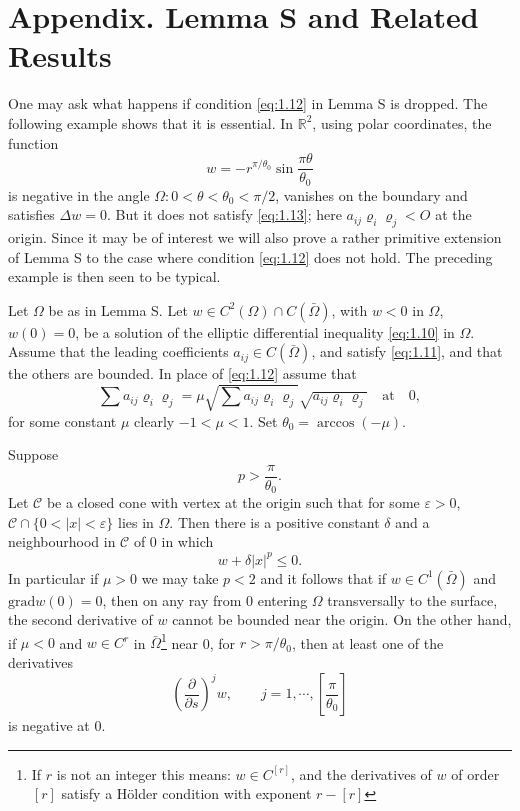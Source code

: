 \section*{Appendix. Lemma S and Related Results}
\setcounter{equation}{0}
\renewcommand{\theequation}{A.\arabic{equation}}
\renewcommand{\thelemma}{A.\arabic{lemma}}

One may ask what happens if condition \eqref{eq:1.12} in Lemma S is dropped. The following example shows that it is essential. In $\mathbb{R}^2$, using polar coordinates, the function
\[w = - r^{\pi/\theta_0} \sin\frac{\pi\theta}{\theta_0}\]
is negative in the angle $\Omega : 0 < \theta < \theta_0 < \pi/2$, vanishes on the boundary and satisfies $\Delta w=0$. But it does not satisfy \eqref{eq:1.13}; here $a_{ij}\varrho_i\varrho_j<O$ at the origin.
Since it may be of interest we will also prove a rather primitive extension of Lemma S to the case where condition \eqref{eq:1.12} does not hold. The preceding example is then seen to be typical.
\begin{lemma}\label{lem:A.1}
	Let $\Omega$ be as in Lemma S. Let $w\in C^2(\Omega)\cap C(\bar{\Omega})$, with $w <0$ in $\Omega$, $w(0) =0$, be a solution of the elliptic differential inequality \eqref{eq:1.10} in $\Omega$. Assume that the leading coefficients $a_{ij}\in C(\bar{\Omega})$, and satisfy \eqref{eq:1.11}, and that the others are bounded. In place of \eqref{eq:1.12} assume that
	\begin{equation}\label{eq:A.1}
		\sum a_{ij}\varrho_i\varrho_j=\mu \sqrt{\sum a_{ij}\varrho_i\varrho_j}\sqrt{a_{ij}\varrho_i\varrho_j}\quad \text{at}\quad 0,
	\end{equation}
	for some constant $\mu$ clearly $-1 <\mu < 1$. Set $\theta_0 = \arccos(-\mu)$.
	
	Suppose 
	\[p>\frac{\pi}{\theta_0}.\]
	Let $\mathscr{C}$ be a closed cone with vertex at the origin such that for some $\varepsilon>0$, $\mathscr{C}\cap\{0 < |x| < \varepsilon\}$ lies in $\Omega$. Then there is a positive constant $\delta$ and a neighbourhood in $\mathscr{C}$ of 0 in which
	\[w+\delta|x|^p\leq 0.\]
	In particular if $\mu>0$ we may take $p<2$ and it follows that if $w\in C^1(\bar{\Omega})$ and $\mathrm{grad }w(0)=0$, then on any ray from 0 entering $\Omega$ transversally to the surface, the second derivative of $w$ cannot be bounded near the origin. On the other hand, if $\mu<0$ and $w\in C^r$ in $\bar{\Omega}$\footnote[1]{If $r$ is not an integer this means: $w\in C^{[r]}$, and the derivatives of $w$ of order $[r]$ satisfy a H\"older condition with exponent $r - [ r ]$} near 0, for $r > \pi/\theta_0$, then at least one of the derivatives
	\[\left(\frac{\partial}{\partial s}\right)^jw,\qquad j=1,\cdots,\left[\frac{\pi}{\theta_0}\right]\]
 is negative at 0.
\end{lemma}
